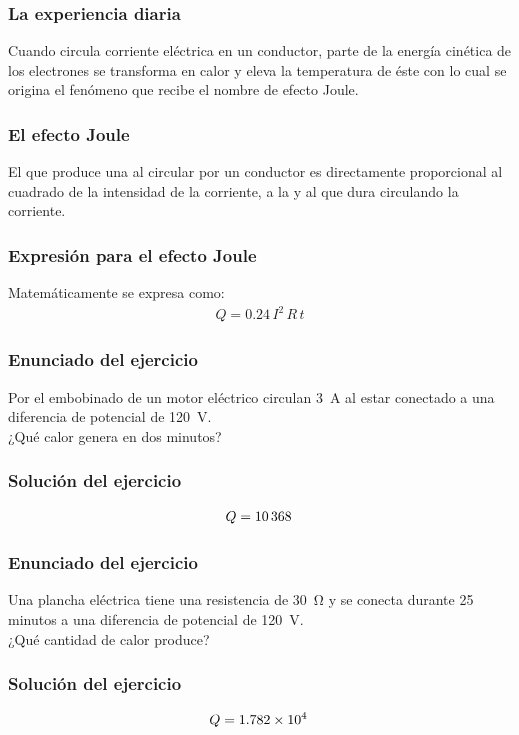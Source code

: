 \documentclass[14pt]{beamer}
\begin{document}
\begin{frame}
\frametitle{La experiencia diaria}
Cuando circula corriente eléctrica en un conductor, parte de la energía cinética de los electrones se transforma en calor y eleva la temperatura de éste \pause con lo cual se origina el fenómeno que recibe el nombre de efecto Joule.
\end{frame}
\begin{frame}
\frametitle{El efecto Joule}
El  que produce una  al circular por un conductor
\pause es directamente proporcional al cuadrado de la intensidad de la corriente, a la  y al  que dura circulando la corriente.
\end{frame}
\begin{frame}
\frametitle{Expresión para el efecto Joule}
Matemáticamente se expresa como:
\pause
\begin{align*}
Q = 0.24 \, I^{2} \,  R \, t
\end{align*}
\end{frame}
\begin{frame}
\frametitle{Enunciado del ejercicio}
Por el embobinado de un motor eléctrico circulan \SI{3}{\ampere} al estar conectado a una diferencia de potencial de \SI{120}{\volt}.
\\
\bigskip
\pause
¿Qué calor genera en dos minutos?
\end{frame}
\begin{frame}
\frametitle{Solución del ejercicio}
\begin{align*}
Q = \SI{10368}{\cal}
\end{align*}
\end{frame}
\begin{frame}
\frametitle{Enunciado del ejercicio}
Una plancha eléctrica tiene una resistencia de \SI{30}{\ohm} y se conecta durante 25 minutos a una diferencia de potencial de \SI{120}{\volt}.
\\
\bigskip
\pause
¿Qué cantidad de calor produce?
\end{frame}
\begin{frame}
\frametitle{Solución del ejercicio}
\begin{align*}
Q = \SI{1.782d4}{\cal}
\end{align*}
\end{frame}
\end{document}
